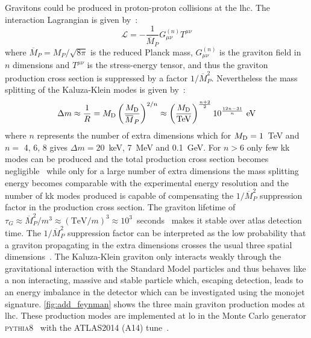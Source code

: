 Gravitons could be produced in proton-proton collisions at the \gls{lhc}. The
interaction Lagrangian is given by~\cite{ADDPhenomenology}:
\begin{equation}
  \label{eq:114}
  \mathcal{L} = - \frac{1}{\overbar{M}_P} G^{(n)}_{\mu\nu} T^{\mu\nu}
\end{equation}
where $\overbar{M}_P = M_P/\sqrt{8 \pi}$ is the reduced Planck mass,
$G^{(n)}_{\mu\nu}$ is the graviton field in $n$ dimensions and $T^{\mu\nu}$ is
the stress-energy tensor, and thus the graviton production cross section is
suppressed by a factor $1/\overbar{M}^2_P$. Nevertheless the mass splitting of
the Kaluza-Klein modes is given by~\cite{ADDPhenomenology}:
\begin{equation}
  \label{eq:115}
  \Delta m \approx \frac{1}{R} = \md \left( \frac{\md}{\overbar{M}_P}
  \right)^{2/n} \approx \left( \frac{\md}{\mathrm{TeV}} \right)^{\frac{n +
  2}{2}} 10^{\frac{12 n - 31}{n}}~\mathrm{eV}
\end{equation}
where $n$ represents the number of extra dimensions which for $M_\mathrm{D} = 1$~TeV and
$n =$ 4, 6, 8 gives $\Delta m = 20$~keV, 7~MeV and 0.1~GeV. For $n > 6$ only few
\gls{kk} modes can be produced and the total production cross section becomes
negligible~\cite{ADDPhenomenology} while only for a large number of extra
dimensions the mass splitting energy becomes comparable with the experimental
energy resolution and the number of \gls{kk} modes produced is capable of
compensating the $1/\overbar{M}^2_P$ suppression factor in the production cross
section. The graviton lifetime of
$\tau_G \approx \overbar{M}^2_P/m^3 \approx (\mathrm{TeV}/m)^3 \approx
10^3$~seconds~\cite{ADDPhenomenology} makes it stable over \gls{atlas} detection
time. The $1/\overbar{M}^2_P$ suppression factor can be interpreted as the low
probability that a graviton propagating in the extra dimensions crosses the
usual three spatial dimensions~\cite{ADDPhenomenology}. The Kaluza-Klein
graviton only interacts weakly through the gravitational interaction with the
Standard Model particles and thus behaves like a non interacting, massive and
stable particle which, escaping detection, leads to an energy imbalance in the
detector which can be investigated using the monojet
signature. \cref{fig:add_feynman} shows the three main graviton production modes
at \gls{lhc}. These production modes are implemented at \gls{lo} in the Monte
Carlo generator \textsc{pythia8}~\cite{PYTHIA8} with the ATLAS2014 (A14)
tune~\cite{PYTHIATune}.
